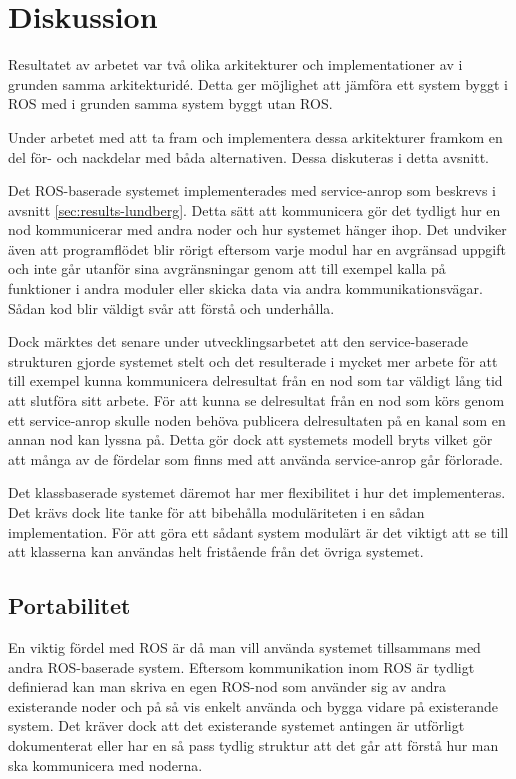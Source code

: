\section{Diskussion}
\label{sec:discussion-lundberg}

Resultatet av arbetet var två olika arkitekturer och implementationer av i grunden samma arkitekturidé. Detta ger möjlighet att jämföra ett system byggt i ROS med i grunden samma system byggt utan ROS.

Under arbetet med att ta fram och implementera dessa arkitekturer framkom en del för- och nackdelar med båda alternativen. Dessa diskuteras i detta avsnitt.

Det ROS-baserade systemet implementerades med service-anrop som beskrevs i avsnitt \ref{sec:results-lundberg}. Detta sätt att kommunicera gör det tydligt hur en nod kommunicerar med andra noder och hur systemet hänger ihop. Det undviker även att programflödet blir rörigt eftersom varje modul har en avgränsad uppgift och inte går utanför sina avgränsningar genom att till exempel kalla på funktioner i andra moduler eller skicka data via andra kommunikationsvägar. Sådan kod blir väldigt svår att förstå och underhålla.

Dock märktes det senare under utvecklingsarbetet att den service-baserade strukturen gjorde systemet stelt och det resulterade i mycket mer arbete för att till exempel kunna kommunicera delresultat från en nod som tar väldigt lång tid att slutföra sitt arbete. För att kunna se delresultat från en nod som körs genom ett service-anrop skulle noden behöva publicera delresultaten på en kanal som en annan nod kan lyssna på. Detta gör dock att systemets modell bryts vilket gör att många av de fördelar som finns med att använda service-anrop går förlorade.

Det klassbaserade systemet däremot har mer flexibilitet i hur det implementeras. Det krävs dock lite tanke för att bibehålla moduläriteten i en sådan implementation. För att göra ett sådant system modulärt är det viktigt att se till att klasserna kan användas helt fristående från det övriga systemet.

\subsection{Portabilitet}
En viktig fördel med ROS är då man vill använda systemet tillsammans med andra ROS-baserade system. Eftersom kommunikation inom ROS är tydligt definierad kan man skriva en egen ROS-nod som använder sig av andra existerande noder och på så vis enkelt använda och bygga vidare på existerande system. Det kräver dock att det existerande systemet antingen är utförligt dokumenterat eller har en så pass tydlig struktur att det går att förstå hur man ska kommunicera med noderna.

